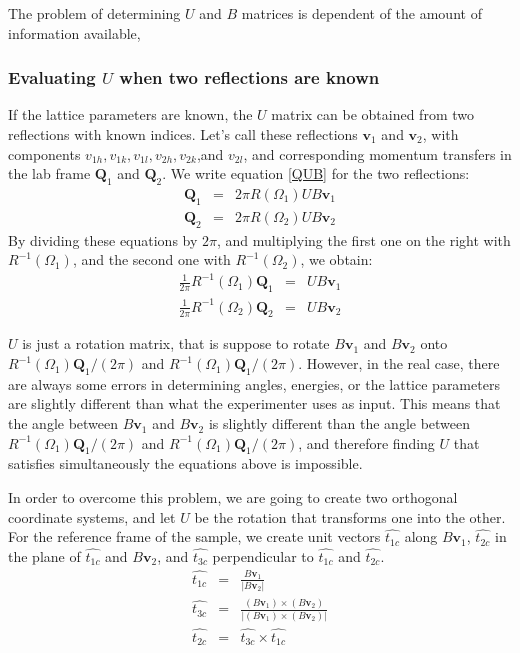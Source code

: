 \documentclass[prb]{revtex4}%
\begin{document}
The problem of determining $U$ and $B$ matrices is dependent of the amount of information available,

\subsubsection{Evaluating $U$ when two reflections are known}

If the lattice parameters are known, the $U$ matrix can be obtained from
two reflections with known indices. Let's call these reflections $\textbf{v}_1$ and $\textbf{v}_2$,
with components $v_{1h}, v_{1k}, v_{1l}, v_{2h}, v_{2k}$,and $v_{2l}$, and corresponding momentum
transfers in the lab frame $\textbf{Q}_1$ and $\textbf{Q}_2$. We write equation \ref{QUB} for the two reflections:
\begin{eqnarray}
  \textbf{Q}_1 &=& 2 \pi R(\Omega_1) U B \textbf{v}_1 \\
  \textbf{Q}_2 &=& 2 \pi R(\Omega_2) U B \textbf{v}_2
\end{eqnarray}
By dividing these equations by $2\pi$, and multiplying the first one on the right with $R^{-1}(\Omega_1)$,
and the second one with $R^{-1}(\Omega_2)$, we obtain:
\begin{eqnarray}
  \frac{1}{2 \pi} R^{-1}(\Omega_1)\textbf{Q}_1 &=&   U B \textbf{v}_1 \\
  \frac{1}{2 \pi} R^{-1}(\Omega_2)\textbf{Q}_2 &=&   U B \textbf{v}_2
\end{eqnarray}

$U$ is just a rotation matrix, that is suppose to rotate $B \textbf{v}_1$ and $ B \textbf{v}_2$ onto
$R^{-1}(\Omega_1)\textbf{Q}_1/(2\pi)$ and $R^{-1}(\Omega_1)\textbf{Q}_1/(2\pi)$. However, in the real case,
there are always some errors in determining angles, energies, or the lattice parameters are slightly different than
what the experimenter uses as input. This means that the angle between $B \textbf{v}_1$ and $ B \textbf{v}_2$ is
slightly different than the angle between $R^{-1}(\Omega_1)\textbf{Q}_1/(2\pi)$ and $R^{-1}(\Omega_1)\textbf{Q}_1/(2\pi)$,
and therefore finding $U$ that satisfies simultaneously the equations above is impossible.

In order to overcome this problem, we are going to create two orthogonal coordinate systems, and let $U$ be the rotation that
transforms one into the other. For the reference frame of the sample, we create unit vectors $\widehat{t_{1c}}$ along $B \textbf{v}_1$,
$\widehat{t_{2c}}$ in the plane of $\widehat{t_{1c}}$ and $B \textbf{v}_2$, and $\widehat{t_{3c}}$ perpendicular to $\widehat{t_{1c}}$
and $\widehat{t_{2c}}$.
\begin{eqnarray}
  \widehat{t_{1c}} &=& \frac{B \textbf{v}_1}{|B \textbf{v}_2|} \\
  \widehat{t_{3c}} &=& \frac{(B \textbf{v}_1)\times(B \textbf{v}_2)}{|(B \textbf{v}_1)\times(B \textbf{v}_2)|} \\
  \widehat{t_{2c}} &=& \widehat{t_{3c}}\times \widehat{t_{1c}}
\end{eqnarray}
\end{document}
